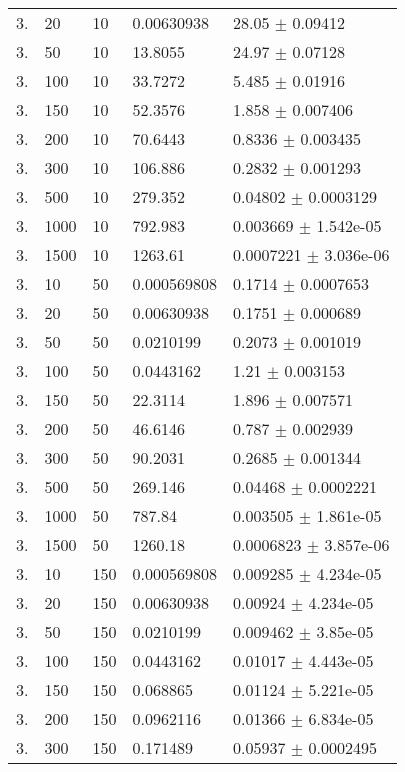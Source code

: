 \begin{longtable}{lllll}
  3. &    20 &    10 & 0.00630938 &    28.05 $\pm$  0.09412 \\
  3. &    50 &    10 &  13.8055 &    24.97 $\pm$  0.07128 \\
  3. &   100 &    10 &  33.7272 &    5.485 $\pm$  0.01916 \\
  3. &   150 &    10 &  52.3576 &    1.858 $\pm$ 0.007406 \\
  3. &   200 &    10 &  70.6443 &   0.8336 $\pm$ 0.003435 \\
  3. &   300 &    10 &  106.886 &   0.2832 $\pm$ 0.001293 \\
  3. &   500 &    10 &  279.352 &  0.04802 $\pm$ 0.0003129 \\
  3. &  1000 &    10 &  792.983 & 0.003669 $\pm$ 1.542e-05 \\
  3. &  1500 &    10 &  1263.61 & 0.0007221 $\pm$ 3.036e-06 \\
  3. &    10 &    50 & 0.000569808 &   0.1714 $\pm$ 0.0007653 \\
  3. &    20 &    50 & 0.00630938 &   0.1751 $\pm$ 0.000689 \\
  3. &    50 &    50 & 0.0210199 &   0.2073 $\pm$ 0.001019 \\
  3. &   100 &    50 & 0.0443162 &     1.21 $\pm$ 0.003153 \\
  3. &   150 &    50 &  22.3114 &    1.896 $\pm$ 0.007571 \\
  3. &   200 &    50 &  46.6146 &    0.787 $\pm$ 0.002939 \\
  3. &   300 &    50 &  90.2031 &   0.2685 $\pm$ 0.001344 \\
  3. &   500 &    50 &  269.146 &  0.04468 $\pm$ 0.0002221 \\
  3. &  1000 &    50 &   787.84 & 0.003505 $\pm$ 1.861e-05 \\
  3. &  1500 &    50 &  1260.18 & 0.0006823 $\pm$ 3.857e-06 \\
  3. &    10 &   150 & 0.000569808 & 0.009285 $\pm$ 4.234e-05 \\
  3. &    20 &   150 & 0.00630938 &  0.00924 $\pm$ 4.234e-05 \\
  3. &    50 &   150 & 0.0210199 & 0.009462 $\pm$ 3.85e-05 \\
  3. &   100 &   150 & 0.0443162 &  0.01017 $\pm$ 4.443e-05 \\
  3. &   150 &   150 & 0.068865 &  0.01124 $\pm$ 5.221e-05 \\
  3. &   200 &   150 & 0.0962116 &  0.01366 $\pm$ 6.834e-05 \\
  3. &   300 &   150 & 0.171489 &  0.05937 $\pm$ 0.0002495 \\

\end{longtable}
